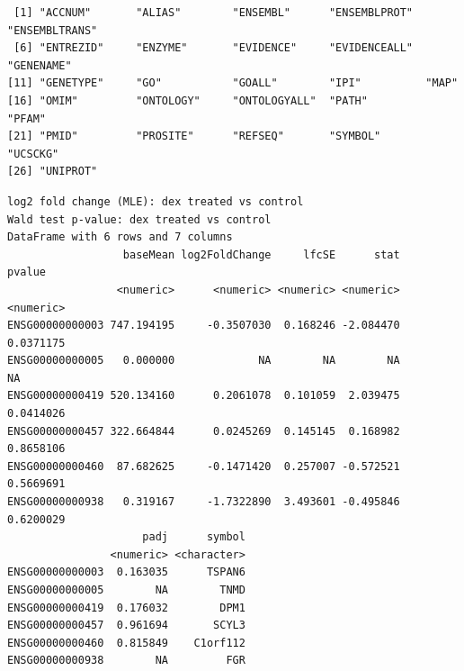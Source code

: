 \documentclass[
  letterpaper,
  DIV=11,
  numbers=noendperiod]{scrartcl}
\newenvironment{Shaded}{\begin{snugshade}}{\end{snugshade}}
\newcommand{\AttributeTok}[1]{\textcolor[rgb]{0.40,0.45,0.13}{#1}}
\newcommand{\CommentTok}[1]{\textcolor[rgb]{0.37,0.37,0.37}{#1}}
\newcommand{\FunctionTok}[1]{\textcolor[rgb]{0.28,0.35,0.67}{#1}}
\newcommand{\NormalTok}[1]{\textcolor[rgb]{0.00,0.23,0.31}{#1}}
\newcommand{\OtherTok}[1]{\textcolor[rgb]{0.00,0.23,0.31}{#1}}
\newcommand{\SpecialCharTok}[1]{\textcolor[rgb]{0.37,0.37,0.37}{#1}}
\newcommand{\StringTok}[1]{\textcolor[rgb]{0.13,0.47,0.30}{#1}}
\begin{document}
\begin{verbatim}
 [1] "ACCNUM"       "ALIAS"        "ENSEMBL"      "ENSEMBLPROT"  "ENSEMBLTRANS"
 [6] "ENTREZID"     "ENZYME"       "EVIDENCE"     "EVIDENCEALL"  "GENENAME"    
[11] "GENETYPE"     "GO"           "GOALL"        "IPI"          "MAP"         
[16] "OMIM"         "ONTOLOGY"     "ONTOLOGYALL"  "PATH"         "PFAM"        
[21] "PMID"         "PROSITE"      "REFSEQ"       "SYMBOL"       "UCSCKG"      
[26] "UNIPROT"     
\end{verbatim}

\begin{Shaded}
\end{Shaded}

\begin{verbatim}
log2 fold change (MLE): dex treated vs control 
Wald test p-value: dex treated vs control 
DataFrame with 6 rows and 7 columns
                  baseMean log2FoldChange     lfcSE      stat    pvalue
                 <numeric>      <numeric> <numeric> <numeric> <numeric>
ENSG00000000003 747.194195     -0.3507030  0.168246 -2.084470 0.0371175
ENSG00000000005   0.000000             NA        NA        NA        NA
ENSG00000000419 520.134160      0.2061078  0.101059  2.039475 0.0414026
ENSG00000000457 322.664844      0.0245269  0.145145  0.168982 0.8658106
ENSG00000000460  87.682625     -0.1471420  0.257007 -0.572521 0.5669691
ENSG00000000938   0.319167     -1.7322890  3.493601 -0.495846 0.6200029
                     padj      symbol
                <numeric> <character>
ENSG00000000003  0.163035      TSPAN6
ENSG00000000005        NA        TNMD
ENSG00000000419  0.176032        DPM1
ENSG00000000457  0.961694       SCYL3
ENSG00000000460  0.815849    C1orf112
ENSG00000000938        NA         FGR
\end{verbatim}
\end{document}

